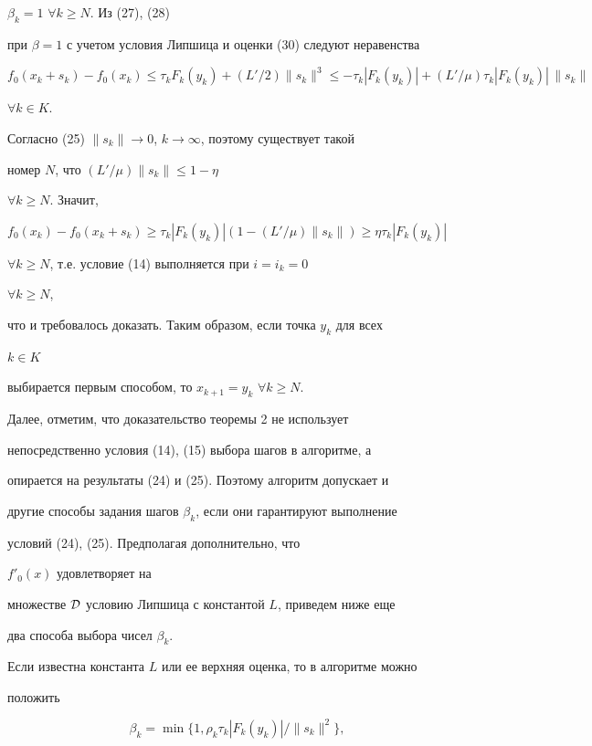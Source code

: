 $\beta_k=1$ $\forall k\ge N$. Из (27), (28)


при $\beta=1$ с учетом условия Липшица и оценки (30) следуют неравенства


$f_0(x_k+s_k)-f_0(x_k)\le\tau_kF_k(y_k)+(L'/2)\|s_k\|^3\le


-\tau_k|F_k(y_k)|+(L'/\mu)\tau_k|F_k(y_k)|\,\|s_k\|$


$\forall k\in K$.


Согласно (25) $\|s_k\|\to 0$, $k\to\infty$, поэтому существует такой


номер $N$, что $(L'/\mu)\|s_k\|\le1-\eta$


$\forall k\ge N$. Значит,


$f_0(x_k)-f_0(x_k+s_k)\ge\tau_k|F_k(y_k)|(1-(L'/\mu)\|s_k\|)\ge


\eta\tau_k|F_k(y_k)|$


$\forall k\ge N$, т.е. условие (14) выполняется при $i=i_k=0$


$\forall k\ge N$,


что и требовалось доказать. Таким образом, если точка $y_k$ для всех


$k\in K$


выбирается первым способом, то $x_{k+1}=y_k$ $\forall k\ge N$.





Далее, отметим, что доказательство теоремы 2 не использует


непосредственно условия (14), (15) выбора шагов в алгоритме, а


опирается на результаты (24) и (25). Поэтому алгоритм допускает и


другие способы задания шагов $\beta_k$, если они гарантируют выполнение


условий (24), (25). Предполагая дополнительно, что


$f'_0(x)$ удовлетворяет на


множестве $\cal D$ условию Липшица с константой $L$, приведем ниже еще


два способа выбора чисел $\beta_k$.





Если известна константа $L$ или ее верхняя оценка, то в алгоритме можно


положить


$$


\beta_k=\min\{1,\rho_k\tau_k|F_k(y_k)|/\|s_k\|^2\},


$$


